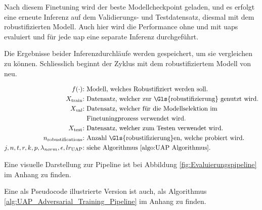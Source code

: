 Nach diesem Finetuning wird der beste Modellcheckpoint geladen, und es erfolgt eine erneute Inferenz auf dem Validierungs- und Testdatensatz, diesmal mit dem robustifizierten Modell. Auch hier wird die Performance ohne und mit \acrshort{uap}s evaluiert und für jede \acrshort{uap} eine separate Inferenz durchgeführt. 

Die Ergebnisse beider Inferenzdurchläufe werden gespeichert, um sie vergleichen zu können. Schliesslich beginnt der Zyklus mit dem robustifiziertem Modell von neu.

\begin{align*}
f(\cdot)\text{:} &\text{ Modell, welches Robustifiziert werden soll.} \\
X_{\text{train}}\text{:} &\text{ Datensatz, welcher zur \Gls{robustifizierung} genutzt wird.} \\
X_{\text{val}}\text{:} &\text{ Datensatz, welcher für die Modellselektion im} \\
 &\text{ Finetuningprozess verwendet wird.}\\
X_{\text{test}}\text{:} &\text{ Datensatz, welcher zum Testen verwendet wird.} \\
n_{\text{robustifications}}\text{:} &\text{ Anzahl \Gls{robustifizierung}en, welche probiert wird.} \\
j,n,t,r,k,p,\lambda_{norm},\epsilon,lr_{\text{UAP}}\text{:} &\text{ siehe Algorithmus \ref{algo:UAP Algorithmus}.}
\end{align*}

Eine visuelle Darstellung zur Pipeline ist bei Abbildung \ref{fig:Evaluierungspipeline} im Anhang zu finden.

Eine als Pseudocode illustrierte Version ist auch, als Algorithmus \ref{alg:UAP_Adversarial_Training_Pipeline} im Anhang zu finden.